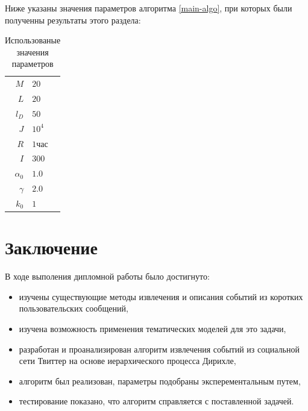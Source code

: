 \documentclass[12pt, a4paper]{article}
\newcommand\todo[1]{\marginpar{\textcolor{red}{#1}}}
\begin{document}
	Ниже указаны значения параметров алгоритма \ref{main-algo}, при которых были полученны результаты этого раздела:
	
	\begin{table}[H]
	\centering
	\begin{tabular}{r | l}
	$M$ & $20$ \\
	$L$ & $20$ \\
	$l_D$ & $50$ \\
	$J$ & $10^4$ \\
	$R$ & $1 час$ \\
	$I$ & $300$ \\
	$\alpha_0$ & $1.0$ \\
	$\gamma$ & $2.0$ \\
	$k_0$ & $1$ \\
	\end{tabular}		
	
	\caption{Использованые значения параметров}
	\label{params-table}
	\end{table}
	
	
	\todo{Таблица с параметрами}
	
	\section{Заключение}
	В ходе выполения дипломной работы было достигнуто:
	\begin{itemize}
	\item изучены существующие методы извлечения и описания событий из коротких пользовательских сообщений,
	\item изучена возможность применения тематических моделей для это задачи,
	\item разработан и проанализирован алгоритм извлечения событий из социальной сети Твиттер на основе иерархического процесса Дирихле,
	\item алгоритм был реализован, параметры подобраны эксперементальным путем,
	\item тестирование показано, что алгоритм справляется с поставленной задачей.
	\end{itemize}
	
\end{document}
